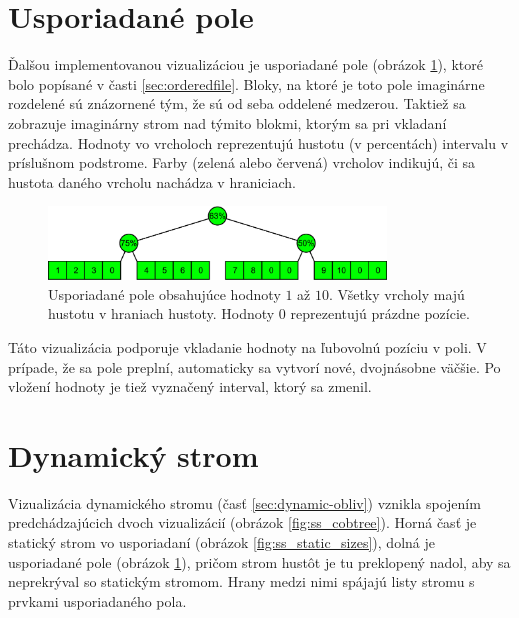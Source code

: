\section{Usporiadané pole}
Ďalšou implementovanou vizualizáciou je usporiadané pole (obrázok \ref{fig:ss_of_overview}), ktoré bolo popísané v časti \ref{sec:orderedfile}. Bloky, na ktoré je toto pole imaginárne rozdelené sú znázornené tým, že sú od seba oddelené medzerou. Taktiež sa zobrazuje imaginárny strom nad týmito blokmi, ktorým sa pri vkladaní prechádza. Hodnoty vo vrcholoch reprezentujú hustotu (v percentách) intervalu v príslušnom podstrome. Farby (zelená alebo červená) vrcholov indikujú, či sa hustota daného vrcholu nachádza v hraniciach.

\begin{figure}
    \centering
    \includegraphics[width=0.8\textwidth]{figures/screenshots/of_overview_3.pdf}
    \caption[Usporiadané pole]{Usporiadané pole obsahujúce hodnoty $1$ až $10$. Všetky vrcholy majú hustotu v hraniach hustoty. Hodnoty $0$ reprezentujú prázdne pozície.}
    \label{fig:ss_of_overview}
\end{figure}

Táto vizualizácia podporuje vkladanie hodnoty na ľubovolnú pozíciu v poli. V prípade, že sa pole preplní, automaticky sa vytvorí nové, dvojnásobne väčšie. Po vložení hodnoty je tiež vyznačený interval, ktorý sa zmenil.

\section{Dynamický strom}
Vizualizácia dynamického stromu (časť \ref{sec:dynamic-obliv}) vznikla spojením predchádzajúcich dvoch vizualizácií (obrázok \ref{fig:ss_cobtree}). Horná časť je statický strom vo  usporiadaní (obrázok \ref{fig:ss_static_sizes}), dolná je usporiadané pole (obrázok \ref{fig:ss_of_overview}), pričom strom hustôt je tu preklopený nadol, aby sa neprekrýval so statickým stromom. Hrany medzi nimi spájajú listy stromu s prvkami usporiadaného pola. 

